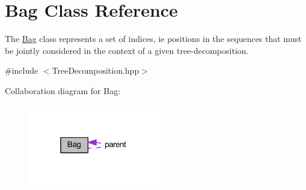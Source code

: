 \hypertarget{class_bag}{}\section{Bag Class Reference}
\label{class_bag}


The \hyperlink{class_bag}{Bag} class represents a set of indices, ie positions in the sequences that must be jointly considered in the context of a given tree-\/decomposition.  




{\ttfamily \#include $<$Tree\+Decomposition.\+hpp$>$}



Collaboration diagram for Bag\+:\nopagebreak
\begin{figure}[H]
\begin{center}
\leavevmode
\includegraphics[width=163pt]{class_bag__coll__graph}
\end{center}
\end{figure}
